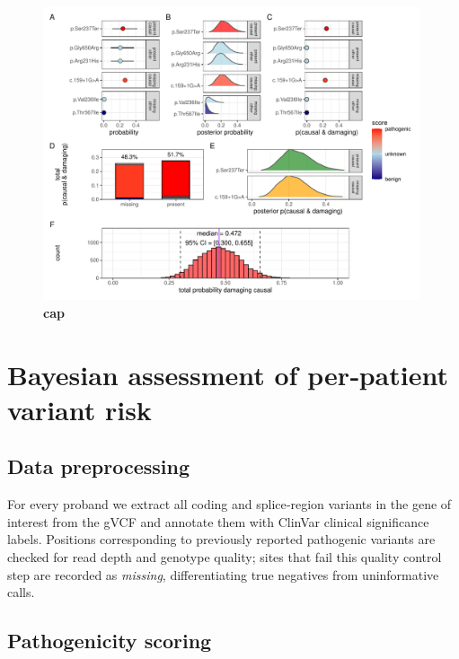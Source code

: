 \begin{figure}[ht]
  \centering
  \includegraphics[width=0.99\textwidth]{../images/plot_quant_uncert_ci.pdf}
  \caption{
   \textbf{cap}
  }
  \label{fig:plot_quant_uncert_ci}
\end{figure}




\section{Bayesian assessment of per‑patient variant risk}

\subsection{Data preprocessing}

For every proband we extract all coding and splice‑region variants in the gene of
interest from the gVCF and annotate them with ClinVar clinical significance
labels.  Positions corresponding to previously reported pathogenic variants are
checked for read depth and genotype quality; sites that fail this quality
control step are recorded as \textit{missing}, differentiating true negatives
from uninformative calls.

\subsection{Pathogenicity scoring}

